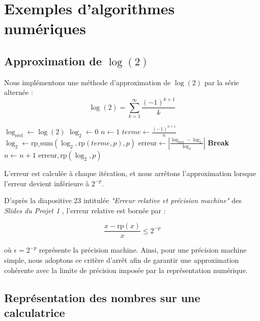 \documentclass{article}
\begin{document}
    

\section{Exemples d'algorithmes numériques}
\label{sec:algo_mun}
\subsection{Approximation de \texorpdfstring{$\log(2)$}{log(2)}}
Nous implémentons une méthode d'approximation de $\log(2)$ par la série alternée :
\begin{equation}
    \log(2) = \sum_{k=1}^{\infty} \frac{(-1)^{k+1}}{k}
\end{equation}
\begin{algorithm}
\caption{Approximation de $\log(2)$ par série alternée}
\begin{algorithmic}[1]
    \State $\log_{\text{réel}} \gets \log(2)$
    \State $\log_2 \gets 0$
    \State $n \gets 1$
        \State $terme \gets \frac{(-1)^{n+1}}{n}$
        \State $\log_2 \gets \text{rp\_sum}(\log_2, \text{rp}(terme, p),p)$
        \State $\text{erreur} \gets \left| \frac{\log_{\text{réel}} - \log_2}{\log_2} \right|$
            \State \textbf{Break}
        \EndIf
        \State $n \gets n + 1$
    \EndWhile
    \State \Return $\text{erreur}, \text{rp}(\log_2, p)$
\end{algorithmic}
\end{algorithm}

L'erreur est calculée à chaque itération, et nous arrêtons l'approximation lorsque l'erreur devient inférieure à $2^{-p}$.  

D'après la diapositive 23 intitulée \textit{"Erreur relative et précision machine"} des \textit{Slides du Projet 1} , l'erreur relative est bornée par :  

\begin{equation}
\frac{x - \text{rp}(x)}{x} \leq 2^{-p}
\end{equation}

où $\epsilon = 2^{-p}$ représente la précision machine. Ainsi, pour une précision machine simple, nous adoptons ce critère d'arrêt afin de garantir une approximation cohérente avec la limite de précision imposée par la représentation numérique.


\subsection{Représentation des nombres sur une calculatrice}
\end{document}
